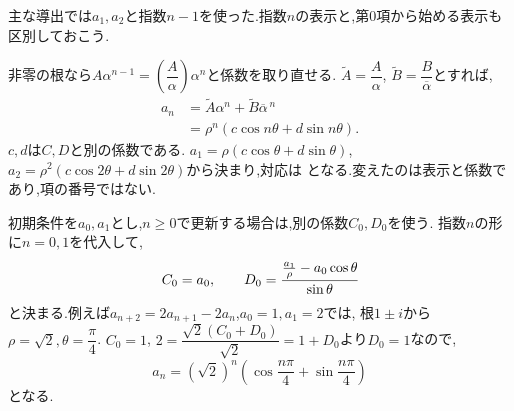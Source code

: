 主な導出では$a_1,a_2$と指数$n-1$を使った.指数$n$の表示と,第0項から始める表示も区別しておこう.

非零の根なら$A\alpha^{n-1}=\left(\dfrac{A}{\alpha}\right)\alpha^n$と係数を取り直せる.
$\widetilde A=\dfrac{A}{\alpha}$, $\widetilde B=\dfrac{B}{\overline\alpha}$とすれば,
\[
  \begin{aligned}
    a_n&=\widetilde A\alpha^n+\widetilde B\overline\alpha^{\,n}\\
    &=\rho^n(c\cos n\theta+d\sin n\theta).
  \end{aligned}
\]
$c,d$は$C,D$と別の係数である.
$a_1=\rho(c\cos\theta+d\sin\theta)$,
$a_2=\rho^2(c\cos2\theta+d\sin2\theta)$から決まり,対応は
\BookMathLayout{\[
    c=\frac{C\cos\theta-D\sin\theta}{\rho},\qquad
    d=\frac{C\sin\theta+D\cos\theta}{\rho}
  \]}{\[
    \begin{aligned}
      c&=\frac{C\cos\theta-D\sin\theta}{\rho},\\
      d&=\frac{C\sin\theta+D\cos\theta}{\rho}
    \end{aligned}
  \]}
となる.変えたのは表示と係数であり,項の番号ではない.

初期条件を$a_0,a_1$とし,$n\ge0$で更新する場合は,別の係数$C_0,D_0$を使う.
指数$n$の形に$n=0,1$を代入して,
\[
  C_0=a_0,\qquad
  D_0=\cfrac{\frac{a_1}{\rho}-a_0\cos\theta}{\sin\theta}
\]
と決まる.例えば$a_{n+2}=2a_{n+1}-2a_n$,$a_0=1,a_1=2$では,
根$1\pm i$から$\rho=\sqrt2,\theta=\dfrac{\pi}{4}$.
$C_0=1$, $2=\dfrac{\sqrt2(C_0+D_0)}{\sqrt2}=1+D_0$より$D_0=1$なので,
\[
  a_n=(\sqrt2)^n\left(\cos\frac{n\pi}{4}+\sin\frac{n\pi}{4}\right)
\]
となる.
